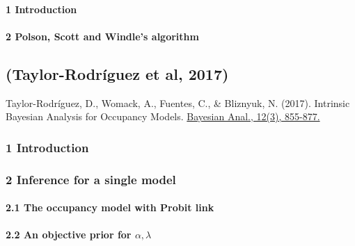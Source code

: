 \documentclass[
]{article}
\begin{document}
\hypertarget{introduction-3}{%
\paragraph{1 Introduction}\label{introduction-3}}

\hypertarget{polson-scott-and-windles-algorithm}{%
\paragraph{2 Polson, Scott and Windle's
algorithm}\label{polson-scott-and-windles-algorithm}}

\hypertarget{taylor-rodruxedguez-et-al-2017}{%
\subsection{(Taylor-Rodríguez et al,
2017)}\label{taylor-rodruxedguez-et-al-2017}}

Taylor-Rodríguez, D., Womack, A., Fuentes, C., \& Bliznyuk, N. (2017).
Intrinsic Bayesian Analysis for Occupancy Models.
\href{https://projecteuclid.org/euclid.ba/1473431536}{Bayesian Anal.,
12(3), 855-877.}

\hypertarget{introduction-4}{%
\subsubsection{1 Introduction}\label{introduction-4}}

\hypertarget{inference-for-a-single-model}{%
\subsubsection{2 Inference for a single
model}\label{inference-for-a-single-model}}

\hypertarget{the-occupancy-model-with-probit-link}{%
\paragraph{2.1 The occupancy model with Probit
link}\label{the-occupancy-model-with-probit-link}}

\hypertarget{an-objective-prior-for-alphalambda}{%
\paragraph{\texorpdfstring{2.2 An objective prior for
\(\alpha,\lambda\)}{2.2 An objective prior for \textbackslash alpha,\textbackslash lambda}}\label{an-objective-prior-for-alphalambda}}
\end{document}
